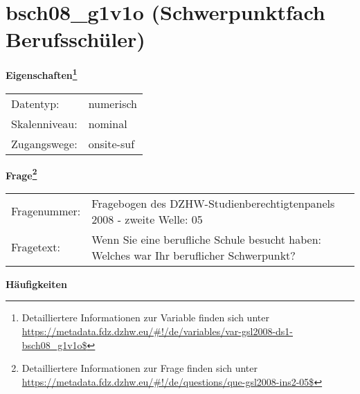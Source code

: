 
    \setcounter{footnote}{0}

    \vspace*{-1.8cm}
	\section{bsch08\_g1v1o (Schwerpunktfach Berufsschüler)}
	\label{section:bsch08_g1v1o}



    \vspace*{0.5cm}
    \noindent\textbf{Eigenschaften\footnote{Detailliertere Informationen zur Variable finden sich unter
		\url{https://metadata.fdz.dzhw.eu/\#!/de/variables/var-gsl2008-ds1-bsch08_g1v1o$}}}\\
	\begin{tabularx}{\hsize}{@{}lX}
	Datentyp: & numerisch \\
	Skalenniveau: & nominal \\
	Zugangswege: &
	  onsite-suf
 \\
    \end{tabularx}



				\vspace*{0.5cm}
                \noindent\textbf{Frage\footnote{Detailliertere Informationen zur Frage finden sich unter
		              \url{https://metadata.fdz.dzhw.eu/\#!/de/questions/que-gsl2008-ins2-05$}}}\\
				\begin{tabularx}{\hsize}{@{}lX}
					Fragenummer: &
					  Fragebogen des DZHW-Studienberechtigtenpanels 2008 - zweite Welle:
					  05
 \\
					Fragetext: & Wenn Sie eine berufliche Schule besucht haben: Welches war Ihr beruflicher Schwerpunkt? \\
				\end{tabularx}





        		\vspace*{0.5cm}
                \noindent\textbf{Häufigkeiten}

